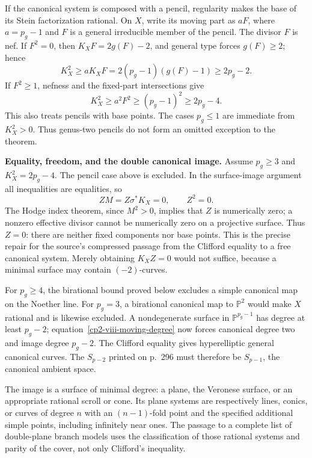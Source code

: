 If the canonical system is composed with a pencil, regularity makes the base of its Stein factorization rational. On \(X\), write its moving part as \(aF\), where \(a=p_g-1\) and \(F\) is a general irreducible member of the pencil. The divisor \(F\) is nef. If \(F^2=0\), then \(K_XF=2g(F)-2\), and general type forces \(g(F)\geq2\); hence
\[
K_X^2\geq aK_XF=2(p_g-1)(g(F)-1)\geq2p_g-2.
\]
If \(F^2\geq1\), nefness and the fixed-part intersections give
\[
K_X^2\geq a^2F^2\geq(p_g-1)^2\geq2p_g-4.
\]
This also treats pencils with base points. The cases \(p_g\leq1\) are immediate from \(K_X^2>0\). Thus genus-two pencils do not form an omitted exception to the theorem.

\textbf{Equality, freedom, and the double canonical image.}
Assume \(p_g\geq3\) and \(K_X^2=2p_g-4\). The pencil case above is excluded. In the surface-image argument all inequalities are equalities, so
\[
ZM=Z\sigma^*K_X=0,\qquad Z^2=0.
\]
The Hodge index theorem, since \(M^2>0\), implies that \(Z\) is numerically zero; a nonzero effective divisor cannot be numerically zero on a projective surface. Thus \(Z=0\): there are neither fixed components nor base points. This is the precise repair for the source's compressed passage from the Clifford equality to a free canonical system. Merely obtaining \(K_XZ=0\) would not suffice, because a minimal surface may contain \((-2)\)-curves.

For \(p_g\geq4\), the birational bound proved below excludes a simple canonical map on the Noether line. For \(p_g=3\), a birational canonical map to \(\mathbb P^2\) would make \(X\) rational and is likewise excluded. A nondegenerate surface in \(\mathbb P^{p_g-1}\) has degree at least \(p_g-2\); equation~\eqref{cp2-viii-moving-degree} now forces canonical degree two and image degree \(p_g-2\). The Clifford equality gives hyperelliptic general canonical curves. The \(S_{p-2}\) printed on p.~296 must therefore be \(S_{p-1}\), the canonical ambient space.

The image is a surface of minimal degree: a plane, the Veronese surface, or an appropriate rational scroll or cone. Its plane systems are respectively lines, conics, or curves of degree \(n\) with an \((n-1)\)-fold point and the specified additional simple points, including infinitely near ones. The passage to a complete list of double-plane branch models uses the classification of those rational systems and parity of the cover, not only Clifford's inequality.

